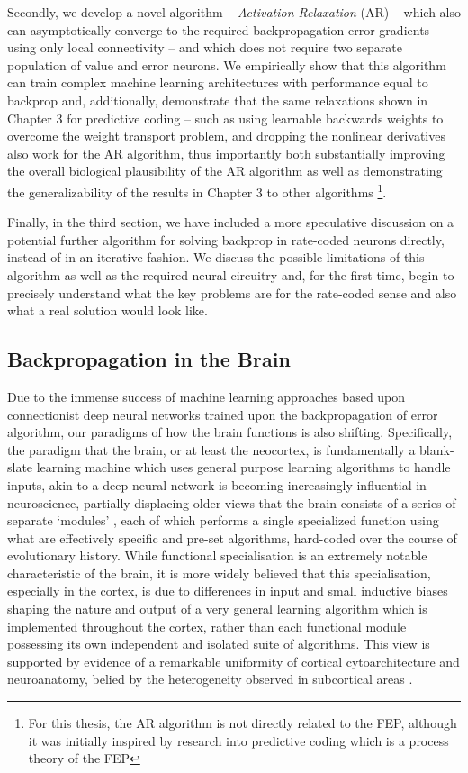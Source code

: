 Secondly, we develop a novel algorithm -- \emph{Activation Relaxation} (AR) -- which also can asymptotically converge to the required backpropagation error gradients using only local connectivity -- and which does not require two separate population of value and error neurons. We empirically show that this algorithm can train complex machine learning architectures with performance equal to backprop and, additionally, demonstrate that the same relaxations shown in Chapter 3 for predictive coding -- such as using learnable backwards weights to overcome the weight transport problem, and dropping the nonlinear derivatives also work for the AR algorithm, thus importantly both substantially improving the overall biological plausibility of the AR algorithm as well as demonstrating the generalizability of the results in Chapter 3 to other algorithms \footnote{For this thesis, the AR algorithm is not directly related to the FEP, although it was initially inspired by research into predictive coding which is a process theory of the FEP}.

Finally, in the third section, we have included a more speculative discussion on a potential further algorithm for solving backprop in rate-coded neurons directly, instead of in an iterative fashion. We discuss the possible limitations of this algorithm as well as the required neural circuitry and, for the first time, begin to precisely understand what the key problems are for the rate-coded sense and also what a real solution would look like.

\subsection{Backpropagation in the Brain}

Due to the immense success of machine learning approaches based upon connectionist deep neural networks trained upon the backpropagation of error algorithm, our paradigms of how the brain functions is also shifting. Specifically, the paradigm that the brain, or at least the neocortex, is fundamentally a blank-slate learning machine which uses general purpose learning algorithms to handle inputs, akin to a deep neural network is becoming increasingly influential in neuroscience, partially displacing older views that the brain consists of a series of separate `modules' \citep{fodor1983modularity,pinker2003language}, each of which performs a single specialized function using what are effectively specific and pre-set algorithms, hard-coded over the course of evolutionary history. While functional specialisation is an extremely notable characteristic of the brain, it is more widely believed that this specialisation, especially in the cortex, is due to differences in input and small inductive biases shaping the nature and output of a very general learning algorithm which is implemented throughout the cortex, rather than each functional module possessing its own independent and isolated suite of algorithms. This view is supported by evidence of a remarkable uniformity of cortical cytoarchitecture and neuroanatomy, belied by the heterogeneity observed in subcortical areas \citep{bear2020neuroscience}.


